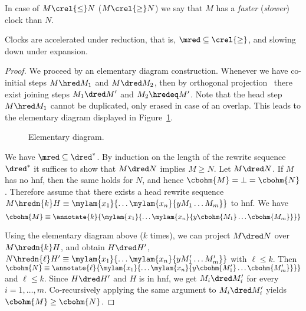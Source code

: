 In case of $M \crel{\le} N$ ($M \crel{\ge} N$) we say that 
$M$ has a \emph{faster} (\emph{slower}) clock than $N$.


\begin{proposition}\label{prop:clocks}
  Clocks are accelerated under reduction, 
  that is, ${\mred} \subseteq {\crel{\ge}}$, and slowing down under expansion.
\end{proposition}

\begin{proof}
  We proceed by an elementary diagram construction.
Whenever we have co-initial steps $M \hred M_1$ and $M \dred M_2$,
  then by orthogonal projection~\cite{terese:2003}
  there exist joining steps $M_1 \dred M'$ and $M_2 \hredeq M'$.
  Note that the head step $M \hred M_1$
  cannot be duplicated, only erased in case of an overlap.
  This leads to the elementary diagram displayed in Figure~\ref{fig:elementary:diagram}.
\begin{figure}[ht!]
  \begin{center}
  \vspace{-2ex}
  \caption{Elementary diagram.}
  \vspace{-2ex}
  \label{fig:elementary:diagram}
  \end{center}
  \end{figure}

  We have ${\mred} \subseteq {\dred^*}$.
  By induction on the length of the rewrite sequence $\dred^*$
  it suffices to show that $M \dred N$ implies $M \ge N$.
  Let $M \dred N$.
  If $M$ has no hnf, then the same holds for $N$, and hence $\cbohm{M} = \bot = \cbohm{N}$.
  Therefore assume that there exists a head rewrite sequence 
  $M \hredn{k} H \equiv \mylam{x_1}{\ldots\mylam{x_n}{y M_1 \ldots M_m}}$ to hnf.
  We have \[\cbohm{M} \equiv \annotate{k}{\mylam{x_1}{\ldots\mylam{x_n}{y \cbohm{M_1} \ldots \cbohm{M_m}}}}\]

  Using the elementary diagram above ($k$ times),
  we can project $M \dred N$ over $M \hredn{k} H$,
  and obtain
  $H \dred H'$, 
  $N \hredn{\ell} H' \equiv \mylam{x_1}{\ldots\mylam{x_n}{y M_1' \ldots M_m'}}$
  with $\ell \le k$.
  Then
  $\cbohm{N} \equiv \annotate{\ell}{\mylam{x_1}{\ldots\mylam{x_n}{y \cbohm{M_1'} \ldots \cbohm{M_m'}}}}$
  and $\ell \le k$.
  Since $H \dred H'$ and $H$ is in hnf,
  we get $M_i \dred M_i'$ for every $i = 1,\ldots,m$.
  Co-recursively applying the same argument to $M_i \dred M_i'$
  yields $\cbohm{M} \ge \cbohm{N}$.
\end{proof}

